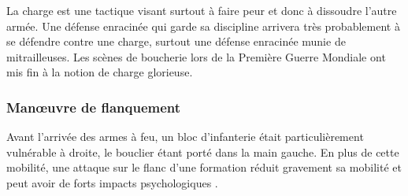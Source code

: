 \documentclass{article}
\begin{document}
La charge est une tactique visant surtout à faire peur et donc à dissoudre l'autre armée. Une défense enracinée qui garde sa discipline arrivera très probablement à se défendre contre une charge, surtout une défense enracinée munie de mitrailleuses. Les scènes de boucherie lors de la Première Guerre Mondiale ont mis fin à la notion de charge glorieuse.

\subsubsection{Manœuvre de flanquement}
Avant l'arrivée des armes à feu, un bloc d'infanterie était particulièrement vulnérable à droite, le bouclier étant porté dans la main gauche. En plus de cette mobilité, une attaque sur le flanc d'une formation réduit gravement sa mobilité et peut avoir de forts impacts psychologiques \cite{tactic,pincer_tactic}.
\end{document}
